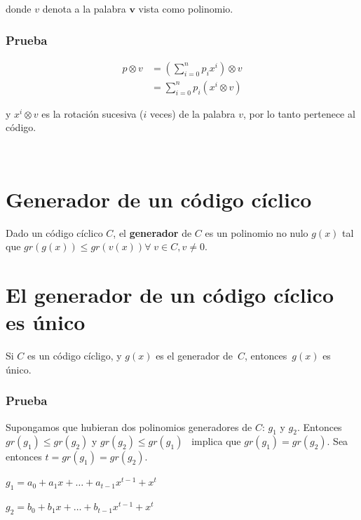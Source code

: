 \documentclass[10pt,a4paper]{article}
\begin{document}
donde $v$ denota a la palabra $\textbf{v}$ vista como polinomio.

\subsubsection*{Prueba}

\begin{center}
\begin{align*} p\otimes v &= \left(\sum\limits_{i = 0}^n p_ix^i\right)\otimes v\\ &= \sum\limits_{i=0}^np_i(x^i\otimes v) \end{align*}
\end{center}

y $x^i \otimes v$ es la rotación sucesiva ($i$ veces) de la palabra $v$, por lo tanto pertenece al código.

\begin{center}
 
\end{center}

\section*{Generador de un código cíclico}

Dado un código cíclico $C$, el \textbf{generador} de $C$ es un polinomio no nulo $g(x)$ tal que $gr(g(x))\leq gr(v(x)) \forall \; v \in C, v\neq 0$.

\section*{El generador de un código cíclico es único}

Si $C$ es un código cícligo, y $g(x)$ es el generador de $C$, entonces $g(x)$ es único.

\subsubsection*{Prueba}

Supongamos que hubieran dos polinomios generadores de $C$: $g_1$ y $g_2$. Entonces $gr(g_1) \leq gr(g_2)$ y $gr(g_2) \leq gr(g_1)$  implica que $gr(g_1) = gr(g_2)$. Sea entonces $t= gr(g_1) = gr(g_2)$.

\begin{center}
$g_1 = a_0 + a_1x + \dots + a_{t-1}x^{t-1}+x^t$
\end{center}

\begin{center}
$g_2 = b_0 + b_1x + \dots + b_{t-1}x^{t-1}+x^t$
\end{center}
\end{document}
